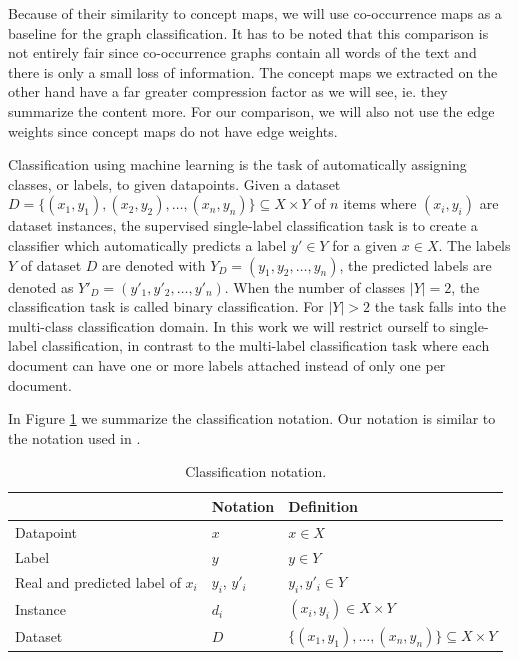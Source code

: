 Because of their similarity to concept maps, we will use co-occurrence maps as a baseline for the graph classification.
It has to be noted that this comparison is not entirely fair since co-occurrence graphs contain all words of the text and there is only a small loss of information.
The concept maps we extracted on the other hand have a far greater compression factor as we will see, ie. they summarize the content more.
For our comparison, we will also not use the edge weights since concept maps do not have edge weights.


Classification using machine learning is the task of automatically assigning classes, or labels, to given datapoints.
Given a dataset $D = \{(x_1, y_1), (x_2, y_2), \ldots, (x_n, y_n) \} \subseteq X \times Y$ of $n$ items where $(x_i, y_i)$ are dataset instances, the supervised single-label classification task is to create a classifier which automatically predicts a label $y' \in Y$ for a given $x \in X$.
The labels $Y$ of dataset $D$ are denoted with $Y_D = (y_1, y_2, \ldots, y_n )$, the predicted labels are denoted as $Y'_D = (y'_1, y'_2, \ldots, y'_n )$.
When the number of classes $|Y| = 2$, the classification task is called binary classification. For $|Y| > 2$ the task falls into the multi-class classification domain.
In this work we will restrict ourself to single-label classification, in contrast to the multi-label classification task where each document can have one or more labels attached instead of only one per document.

In Figure \ref{table:classification_notation} we summarize the classification notation.
Our notation is similar to the notation used in \cite[p.~11]{Bishop2006}.

\begin{table}[htb!]
	\centering
	\begin{tabular}{lll}
		& Notation & Definition \\
		\toprule
		Datapoint & $x$ & $x \in X$
		\\
		Label & $y$ & $y \in Y$
		\\
		Real and predicted label of $x_i$ & $y_i$, $y'_i$ &  $y_i, y'_i \in Y$
		\\
		Instance & $d_i$ & $(x_i, y_i) \in X \times Y$
		\\
		Dataset & $D$ & $\{(x_1, y_1), \ldots, (x_n, y_n) \} \subseteq X \times Y$ 
	\end{tabular}
	\caption[Notation: Classification]{Classification notation.}\label{table:classification_notation}
\end{table}

